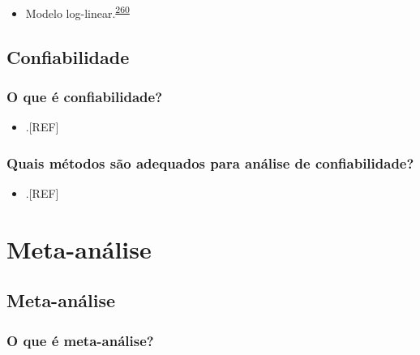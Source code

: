 \documentclass[
  a4paper,
]{book}
\providecommand{\tightlist}{%
  \setlength{\itemsep}{0pt}\setlength{\parskip}{0pt}}
\begin{document}
\begin{itemize}
\tightlist
\item
  Modelo log-linear.\textsuperscript{\protect\hyperlink{ref-banerjee1999}{260}}
\end{itemize}

\hypertarget{confiabilidade}{%
\section{Confiabilidade}\label{confiabilidade}}

\hypertarget{o-que-uxe9-confiabilidade}{%
\subsection{O que é confiabilidade?}\label{o-que-uxe9-confiabilidade}}

\begin{itemize}
\tightlist
\item
  .{[}REF{]}
\end{itemize}

\hypertarget{quais-muxe9todos-suxe3o-adequados-para-anuxe1lise-de-confiabilidade}{%
\subsection{Quais métodos são adequados para análise de confiabilidade?}\label{quais-muxe9todos-suxe3o-adequados-para-anuxe1lise-de-confiabilidade}}

\begin{itemize}
\tightlist
\item
  .{[}REF{]}
\end{itemize}

\hypertarget{meta-analise}{%
\chapter{\texorpdfstring{\textbf{Meta-análise}}{Meta-análise}}\label{meta-analise}}

\hypertarget{meta-analise}{%
\section{Meta-análise}\label{meta-analise}}

\hypertarget{o-que-uxe9-meta-anuxe1lise}{%
\subsection{O que é meta-análise?}\label{o-que-uxe9-meta-anuxe1lise}}
\end{document}
